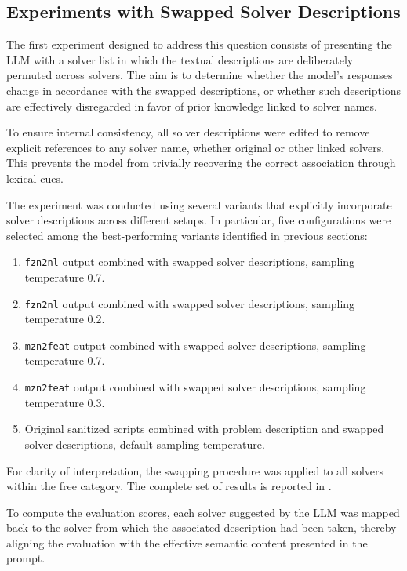 \documentclass[../../main]{subfiles}
\begin{document}
\subsection{Experiments with Swapped Solver Descriptions}
\label{sec:swappedFree}

The first experiment designed to address this question consists of presenting the LLM with a solver list in which the textual descriptions are deliberately permuted across solvers. The aim is to determine whether the model's responses change in accordance with the swapped descriptions, or whether such descriptions are effectively disregarded in favor of prior knowledge linked to solver names.

To ensure internal consistency, all solver descriptions were edited to remove explicit references to any solver name, whether original or other linked solvers. This prevents the model from trivially recovering the correct association through lexical cues.

The experiment was conducted using several variants that explicitly incorporate solver descriptions across different setups. In particular, five configurations were selected among the best-performing variants identified in previous sections:
\begin{enumerate}
    \item \texttt{fzn2nl} output combined with swapped solver descriptions, sampling temperature 0.7.
    \item \texttt{fzn2nl} output combined with swapped solver descriptions, sampling temperature 0.2.
    \item \texttt{mzn2feat} output combined with swapped solver descriptions, sampling temperature 0.7.
    \item \texttt{mzn2feat} output combined with swapped solver descriptions, sampling temperature 0.3.
    \item Original sanitized scripts combined with problem description and swapped solver descriptions, default sampling temperature.
\end{enumerate}

For clarity of interpretation, the swapping procedure was applied to all solvers within the free category. The complete set of results is reported in . 

To compute the evaluation scores, each solver suggested by the LLM was mapped back to the solver from which the associated description had been taken, thereby aligning the evaluation with the effective semantic content presented in the prompt.
\end{document}
